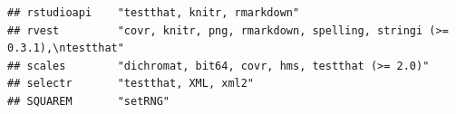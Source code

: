\documentclass[]{article}
\begin{document}
\begin{verbatim}
## rstudioapi    "testthat, knitr, rmarkdown"                                                                                                                                                                                                                                                                                                                                                                                                                                                                                                                                                              
## rvest         "covr, knitr, png, rmarkdown, spelling, stringi (>= 0.3.1),\ntestthat"                                                                                                                                                                                                                                                                                                                                                                                                                                                                                                                    
## scales        "dichromat, bit64, covr, hms, testthat (>= 2.0)"                                                                                                                                                                                                                                                                                                                                                                                                                                                                                                                                          
## selectr       "testthat, XML, xml2"                                                                                                                                                                                                                                                                                                                                                                                                                                                                                                                                                                     
## SQUAREM       "setRNG"                                                                                                                                                                                                                                                                                                                                                                                                                                                                                                                                                                                  

\end{verbatim}
\end{document}
